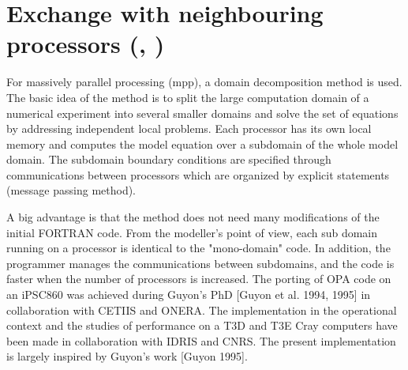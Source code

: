 \section  [Exchange with neighbouring processors (\textit{lbclnk}, \textit{lib\_mpp})]
		{Exchange with neighbouring processors (, )}
\label{LBC_mpp}

For massively parallel processing (mpp), a domain decomposition method is used. 
The basic idea of the method is to split the large computation domain of a numerical 
experiment into several smaller domains and solve the set of equations by addressing 
independent local problems. Each processor has its own local memory and computes 
the model equation over a subdomain of the whole model domain. The subdomain 
boundary conditions are specified through communications between processors 
which are organized by explicit statements (message passing method). 

A big advantage is that the method does not need many modifications of the initial 
FORTRAN code. From the modeller's point of view, each sub domain running on 
a processor is identical to the "mono-domain" code. In addition, the programmer 
manages the communications between subdomains, and the code is faster when 
the number of processors is increased. The porting of OPA code on an iPSC860 
was achieved during Guyon's PhD [Guyon et al. 1994, 1995] in collaboration with 
CETIIS and ONERA. The implementation in the operational context and the studies 
of performance on a T3D and T3E Cray computers have been made in collaboration 
with IDRIS and CNRS. The present implementation is largely inspired by Guyon's 
work  [Guyon 1995].

